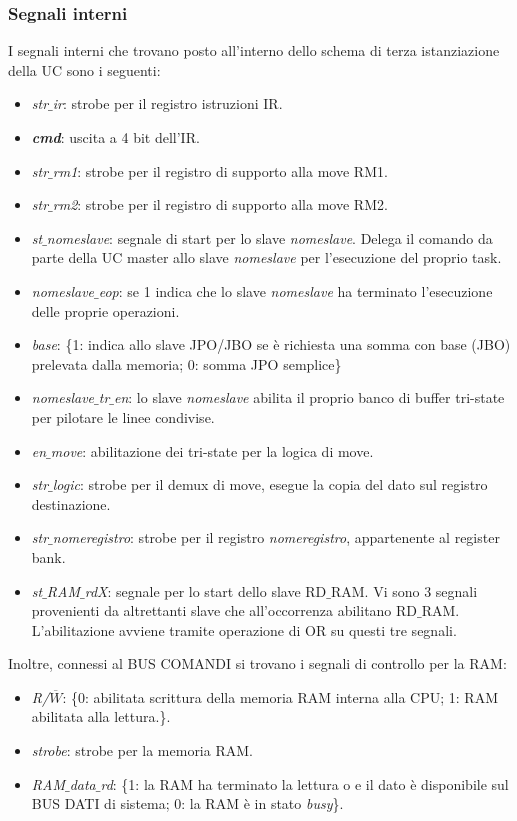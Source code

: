 \subsubsection{Segnali interni}
I segnali interni che trovano posto all'interno dello schema di terza istanziazione della UC sono i seguenti:
\begin{itemize}
	\item \textit{str$\_$ir}: strobe per il registro istruzioni IR.
	\item \textit{\textbf{cmd}}: uscita a 4 bit dell'IR.
	\item \textit{str$\_$rm1}: strobe per il registro di supporto alla move RM1.
	\item \textit{str$\_$rm2}: strobe per il registro di supporto alla move RM2.
	\item \textit{st$\_$nomeslave}: segnale di start per lo slave \textit{nomeslave}. Delega il comando da parte della UC master allo slave \textit{nomeslave} per l'esecuzione del proprio task.
	\item \textit{nomeslave$\_$eop}: se 1 indica che lo slave \textit{nomeslave} ha terminato l'esecuzione delle proprie operazioni.
	\item \textit{base}: \{1: indica allo slave JPO/JBO se è richiesta una somma con base (JBO) prelevata dalla memoria; 0: somma JPO semplice\}\item \textit{nomeslave$\_$tr$\_$en}: lo slave \textit{nomeslave} abilita il proprio banco di buffer tri-state per pilotare le linee condivise.
	\item \textit{en$\_$move}: abilitazione dei tri-state per la logica di move.
	\item \textit{str$\_$logic}: strobe per il demux di move, esegue la copia del dato sul registro destinazione.
	\item \textit{str$\_$nomeregistro}: strobe per il registro \textit{nomeregistro}, appartenente al register bank.
	\item \textit{st$\_$RAM$\_$rdX}: segnale per lo start dello slave RD$\_$RAM. Vi sono 3 segnali provenienti da altrettanti slave che all'occorrenza abilitano RD$\_$RAM. L'abilitazione avviene tramite operazione di OR su questi tre segnali.
\end{itemize}
Inoltre, connessi al BUS COMANDI si trovano i segnali di controllo per la RAM:
\begin{itemize}
	\item \textit{R/$\overline{W}$}: \{0: abilitata scrittura della memoria RAM interna alla CPU; 1: RAM abilitata alla lettura.\}.
	\item \textit{strobe}: strobe per la memoria RAM.
	\item \textit{RAM$\_$data$\_$rd}: \{1: la RAM ha terminato la lettura o e il dato è disponibile sul BUS DATI di sistema; 0: la RAM è in stato \textit{busy}\}.
\end{itemize}

